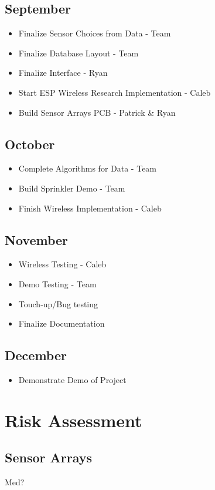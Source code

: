 \documentclass[letterpaper, 10 pt, conference]{ieeeconf}  %
\begin{document}
\subsection{September}
\begin{itemize}
  \item Finalize Sensor Choices from Data - Team
  \item Finalize Database Layout - Team
  \item Finalize Interface - Ryan
  \item Start ESP Wireless Research Implementation - Caleb
  \item Build Sensor Arrays PCB - Patrick \& Ryan
\end{itemize}

\subsection{October}
\begin{itemize}
  \item Complete Algorithms for Data - Team
  \item Build Sprinkler Demo - Team
  \item Finish Wireless Implementation - Caleb
\end{itemize}

\subsection{November}
\begin{itemize}
  \item Wireless Testing - Caleb
  \item Demo Testing - Team
  \item Touch-up/Bug testing
  \item Finalize Documentation
\end{itemize}

\subsection{December}
\begin{itemize}
  \item Demonstrate Demo of Project
\end{itemize}

\section{Risk Assessment}
\subsection{Sensor Arrays}
Med?
\end{document}
